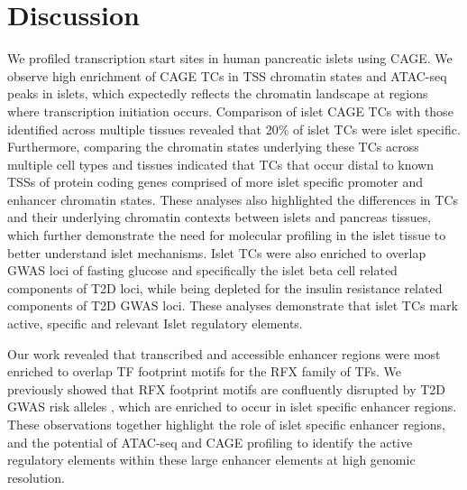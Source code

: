 \section{Discussion}
We profiled transcription start sites in human pancreatic islets using CAGE. We observe high enrichment of CAGE TCs in TSS chromatin states and ATAC-seq peaks in islets, which expectedly reflects the chromatin landscape at regions where transcription initiation occurs. Comparison of islet CAGE TCs with those identified across multiple tissues revealed that 20\% of islet TCs were islet specific. Furthermore, comparing the chromatin states underlying these TCs across multiple cell types and tissues indicated that TCs that occur distal to known TSSs of protein coding genes comprised of more islet specific promoter and enhancer chromatin states. These analyses also highlighted the differences in TCs and their underlying chromatin contexts between islets and pancreas tissues, which further demonstrate the need for molecular profiling in the islet tissue to better understand islet mechanisms. Islet TCs were also enriched to overlap GWAS loci of fasting glucose and specifically the islet beta cell related components of T2D loci, while being depleted for the insulin resistance related components of T2D GWAS loci. These analyses demonstrate that islet TCs mark active, specific and relevant Islet regulatory elements. 

Our work revealed that transcribed and accessible enhancer regions were most enriched to overlap TF footprint motifs for the RFX family of TFs. We previously showed that RFX footprint motifs are confluently disrupted by T2D GWAS risk alleles \cite{varshneyGeneticRegulatorySignatures2017}, which are enriched to occur in islet specific enhancer regions. These observations together highlight the role of islet specific enhancer regions, and the potential of ATAC-seq and CAGE profiling to identify the active regulatory elements within these large enhancer elements at high genomic resolution.

